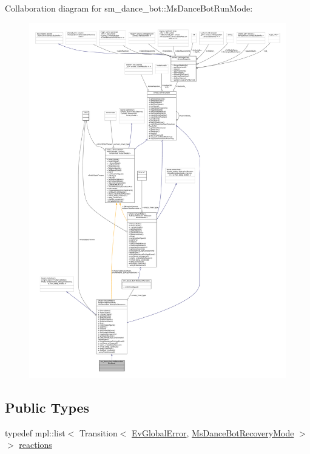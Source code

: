 Collaboration diagram for sm\+\_\+dance\+\_\+bot\+:\+:Ms\+Dance\+Bot\+Run\+Mode\+:
\nopagebreak
\begin{figure}[H]
\begin{center}
\leavevmode
\includegraphics[width=350pt]{classsm__dance__bot_1_1MsDanceBotRunMode__coll__graph}
\end{center}
\end{figure}
\subsection*{Public Types}
\begin{DoxyCompactItemize}
\item 
typedef mpl\+::list$<$ Transition$<$ \hyperlink{structsm__dance__bot_1_1EvGlobalError}{Ev\+Global\+Error}, \hyperlink{classsm__dance__bot_1_1MsDanceBotRecoveryMode}{Ms\+Dance\+Bot\+Recovery\+Mode} $>$ $>$ \hyperlink{classsm__dance__bot_1_1MsDanceBotRunMode_af3a90639a2610f394d8487a2b1725c56}{reactions}
\end{DoxyCompactItemize}
